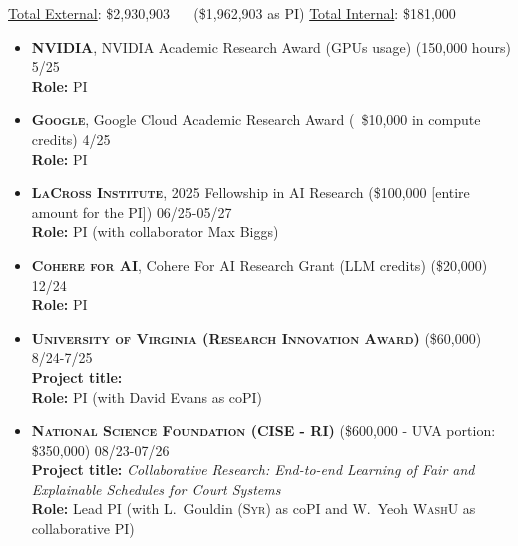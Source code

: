 \smallskip
\begin{keywords}
{\underline{Total External}: \$2,930,903 ~~ (\$1,962,903 as PI) 
\hspace{8pt} \underline{Total Internal}: \$181,000}%
\end{keywords}

\begin{itemize}
	\item \textbf{\textsc{NVIDIA}}, 
	NVIDIA Academic Research Award (GPUs usage) (150,000 hours) \hfill \textsc{5/25}\\
	{\bf Role:} PI

	\item \textbf{\textsc{Google}}, 
	Google Cloud Academic Research Award (~\$10,000 in compute credits) \hfill \textsc{4/25}\\
	{\bf Role:} PI

	\item \textbf{\textsc{LaCross Institute}}, 
	2025 Fellowship in AI Research 
	(\$100,000 [entire amount for the PI]) \hfill \textsc{06/25-05/27}\\
	{\bf Role:} PI (with collaborator Max Biggs)

	\item \textbf{\textsc{Cohere for AI}}, 
	Cohere For AI Research Grant (LLM credits) (\$20,000) \hfill \textsc{12/24}\\
	{\bf Role:} PI

	\item \textbf{\textsc{University of Virginia (Research Innovation Award)}}
	(\$60,000)
	\hfill \textsc{8/24-7/25}\\
	{\bf Project title:} \\
	{\bf Role:} PI (with David Evans as coPI)

	\item 
	\textbf{\textsc{National Science Foundation (CISE - RI)}}
	(\$600,000 - UVA portion: \$350,000)
	\hfill \textsc{08/23-07/26}\\
	{\bf Project title:} 
	{\em Collaborative Research: End-to-end Learning of Fair and Explainable Schedules for Court Systems}\\
	{\bf Role:} Lead PI (with L.~Gouldin (\textsc{Syr}) as coPI and W.~Yeoh \textsc{WashU} as collaborative PI)


\end{itemize}
